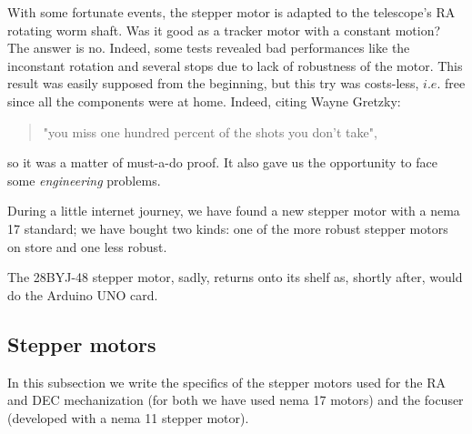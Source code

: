 \documentclass{article}
\begin{document}
\begin{multicols}{2}
        With some fortunate events, the stepper motor is adapted to the telescope's RA rotating worm shaft.
        Was it good as a tracker motor with a constant motion?
        The answer is no.
        Indeed, some tests revealed bad performances like the inconstant rotation and several stops due to lack of robustness of the motor.
        This result was easily supposed from the beginning, but this try was costs-less, \(i.e.\) free since all the components were at home.
        Indeed, citing Wayne Gretzky:
        \begin{quote}
            "you miss one hundred percent of the shots you don't take",
        \end{quote}
        so it was a matter of must-a-do proof.
        It also gave us the opportunity to face some \textit{engineering} problems.
        
        During a little internet journey, we have found a new stepper motor with a nema 17 standard;
        we have bought two kinds: one of the more robust stepper motors on store and one less robust.
        
        The 28BYJ-48 stepper motor, sadly, returns onto its shelf as, shortly after, would do the Arduino UNO card.

        \subsection{Stepper motors}
        In this subsection we write the specifics of the stepper motors used for the RA and DEC mechanization (for both we have used nema 17 motors) and the focuser (developed with a nema 11 stepper motor).


\end{multicols}
\end{document}
